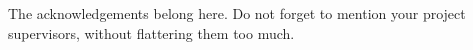 
\begin{acknowledgements}

The acknowledgements belong here. Do not forget to mention your project supervisors, without flattering them too much.
\end{acknowledgements}

